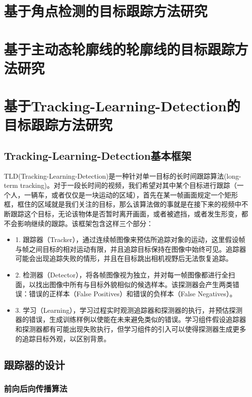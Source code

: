 \section{基于角点检测的目标跟踪方法研究}





\section{基于主动态轮廓线的轮廓线的目标跟踪方法研究}



\section{基于Tracking-Learning-Detection的目标跟踪方法研究}
\subsection{Tracking-Learning-Detection基本框架}
TLD(Tracking-Learning-Detection)是一种针对单一目标的长时间跟踪算法(long-term tracking)。对于一段长时间的视频，我们希望对其中某个目标进行跟踪（一个人，一辆车，或者仅仅是一块运动的区域），首先在某一帧画面规定一个矩形框，框住的区域就是我们关注的目标，那么该算法做的事就是在接下来的视频中不断跟踪这个目标，无论该物体是否暂时离开画面，或者被遮挡，或者发生形变，都不会影响继续的跟踪。该框架包含这样三个部分：
\begin{itemize}
	\item 1. 跟踪器（Tracker），通过连续帧图像来预估所追踪对象的运动，这里假设帧与帧之间目标的相对运动有限，并且追踪目标保持在图像中始终可见。追踪器可能会出现追踪失败的情形，并且在目标跳出相机视野后无法恢复追踪。
	\item 2. 检测器（Detector），将各帧图像视为独立，并对每一帧图像都进行全扫面，以找出图像中所有与目标外貌相似的候选样本。该探测器会产生两类错误：错误的正样本（False Positives）和错误的负样本（False Negatives）。
	\item 3. 学习（Learning），学习过程实时观测追踪器和探测器的执行，并预估探测器的错误，生成训练样例以使能在未来避免类似的错误。学习组件假设追踪器和探测器都有可能出现失败执行，但学习组件的引入可以使得探测器生成更多的追踪目标外观，以区别背景。
\end{itemize}
\subsection{跟踪器的设计}
\subsubsection{前向后向传播算法}

